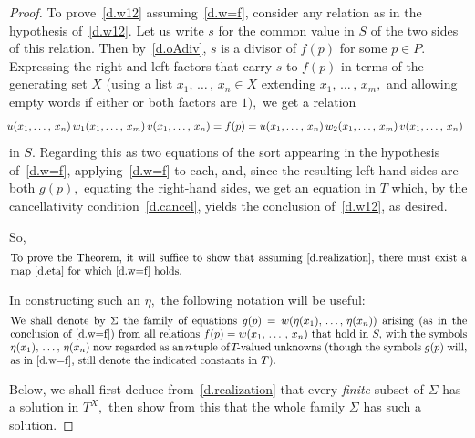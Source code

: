 \documentclass{amsart}
\numberwithin{equation}{section}
\numberwithin{theorem}{section}
\newcommand{\2}{\mathbf{2}}
\begin{document}
\begin{proof}
To prove~\eqref{d.w12} assuming~\eqref{d.w=f}, consider
any relation as in the hypothesis of~\eqref{d.w12}.
Let us write $s$ for the common value in $S$
of the two sides of this relation.
Then by~\eqref{d.oAdiv},
$s$ is a divisor of $f(p)$ for some $p\in P.$
Expressing the right and left factors that
carry $s$ to $f(p)$ in terms of
the generating set $X$ (using a list $x_1,\,\dots\,,\,x_n\in X$
extending $x_1,\,\dots\,,\,x_m,$ and allowing empty words
if either or both factors are $1),$ we get a relation
%
\begin{equation}\begin{minipage}[c]{35pc}\label{d.uw12v}
$\!\!u(x_1,\dots,\,x_n)\,w_1(x_1,\dots,\,x_m)\,
v(x_1,\dots,\,x_n) = f(p) =
u(x_1,\dots,\,x_n)\,w_2(x_1,\dots,\,x_m)\,v(x_1,\dots,\,x_n)\!\!$
\end{minipage}\end{equation}
%
in $S.$
Regarding this as two equations of the sort appearing
in the hypothesis of~\eqref{d.w=f}, applying~\eqref{d.w=f}
to each, and, since the resulting left-hand sides
are both $g(p),$ equating the right-hand sides,
we get an equation in $T$ which,
by the cancellativity condition~\eqref{d.cancel},
yields the conclusion of~\eqref{d.w12}, as desired.

So,
%
\begin{equation}\begin{minipage}[c]{35pc}\label{d.iff}
To prove the Theorem, it will suffice to show that
assuming~\eqref{d.realization},
there must exist a map~\eqref{d.eta} for which~\eqref{d.w=f} holds.
\end{minipage}\end{equation}
%

In constructing such an $\eta,$
the following notation will be useful:
%
\begin{equation}\begin{minipage}[c]{35pc}\label{d.Sigma}
We shall denote by $\Sigma$ the family of equations
$g(p)=w(\eta(x_1),\,\dots,\,\eta(x_n))$ arising
(as in the conclusion of~\eqref{d.w=f})
from all relations $f(p)=w(x_1,\,\dots\,,\,x_n)$ that
hold in $S,$ with the symbols $\eta(x_1),\,\dots,\,\eta(x_n)$
now regarded as an $\!n\!$-tuple of $\!T\!$-valued unknowns
(though the symbols $g(p)$ will, as in~\eqref{d.w=f},
still denote the indicated constants in~$T).$
\end{minipage}\end{equation}

Below, we shall first deduce from~\eqref{d.realization} that
every {\em finite} subset of $\Sigma$ has a solution
in $T^X,$ then show from this that the whole family $\Sigma$
has such a solution.


\end{proof}
\end{document}
